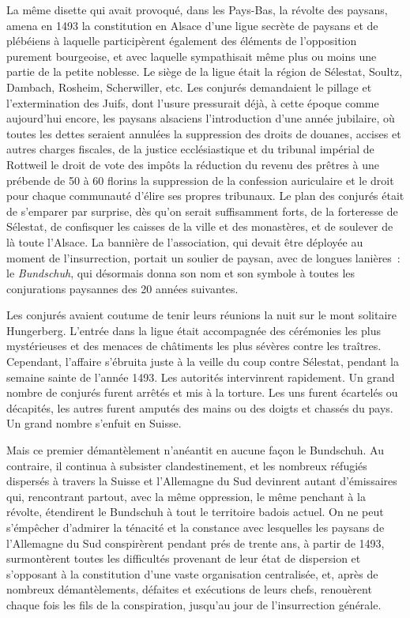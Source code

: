 \documentclass[french,twoside]{book} %
\begin{document}
La même disette qui avait provoqué, dans les Pays-Bas, la révolte des paysans, amena en 1493 la constitution en Alsace d’une ligue secrète de paysans et de plébéiens à laquelle participèrent également des éléments de l’opposition purement bourgeoise, et avec laquelle sympathisait même plus ou moins une partie de la petite noblesse. Le siège de la ligue était la région de Sélestat, Soultz, Dambach, Rosheim, Scherwiller, etc. Les conjurés demandaient le pillage et l’extermination des Juifs, dont l’usure pressurait déjà, à cette époque comme aujourd’hui encore, les paysans alsaciens l’introduction d’une année jubilaire, où toutes les dettes seraient annulées la suppression des droits de douanes, accises et autres charges fiscales, de la justice ecclésiastique et du tribunal impérial de Rottweil le droit de vote des impôts la réduction du revenu des prêtres à une prébende de 50 à 60 florins la suppression de la confession auriculaire et le droit pour chaque communauté d’élire ses propres tribunaux. Le plan des conjurés était de s’emparer par surprise, dès qu’on serait suffisamment forts, de la forteresse de Sélestat, de confisquer les caisses de la ville et des monastères, et de soulever de là toute l’Alsace. La bannière de l’association, qui devait être déployée au moment de l’insurrection, portait un soulier de paysan, avec de longues lanières : le \emph{Bundschuh}, qui désormais donna son nom et son symbole à toutes les conjurations paysannes des 20 années suivantes.\par
Les conjurés avaient coutume de tenir leurs réunions la nuit sur le mont solitaire Hungerberg. L’entrée dans la ligue était accompagnée des cérémonies les plus mystérieuses et des menaces de châtiments les plus sévères contre les traîtres. Cependant, l’affaire s’ébruita juste à la veille du coup contre Sélestat, pendant la semaine sainte de l’année 1493. Les autorités intervinrent rapidement. Un grand nombre de conjurés furent arrêtés et mis à la torture. Les uns furent écartelés ou décapités, les autres furent amputés des mains ou des doigts et chassés du pays. Un grand nombre s’enfuit en Suisse.\par
Mais ce premier démantèlement n’anéantit en aucune façon le Bundschuh. Au contraire, il continua à subsister clandestinement, et les nombreux réfugiés dispersés à travers la Suisse et l’Allemagne du Sud devinrent autant d’émissaires qui, rencontrant partout, avec la même oppression, le même penchant à la révolte, étendirent le Bundschuh à tout le territoire badois actuel. On ne peut s’émpêcher d’admirer la ténacité et la constance avec lesquelles les paysans de l’Allemagne du Sud conspirèrent pendant prés de trente ans, à partir de 1493, surmontèrent toutes les difficultés provenant de leur état de dispersion et s’opposant à la constitution d’une vaste organisation centralisée, et, après de nombreux démantèlements, défaites et exécutions de leurs chefs, renouèrent chaque fois les fils de la conspiration, jusqu’au jour de l’insurrection générale.\par
\end{document}
